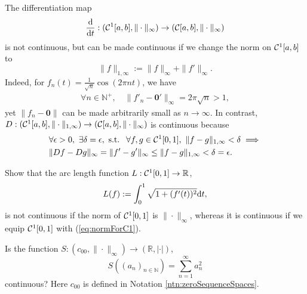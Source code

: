 \begin{exm}
  \label{exm:continuityOfDifferentiation}
  The differentiation map
  \begin{displaymath}
    \frac{\mathrm{d}}{\mathrm{d} t}:
    ({\cal C}^1[a,b],\|\cdot\|_{\infty})
    \rightarrow ({\cal C}[a,b], \|\cdot\|_{\infty})
  \end{displaymath}
  is not continuous, but can be made
  continuous if we change the norm on ${\cal C}^1[a,b]$ to
  \begin{equation}
    \label{eq:normForC1}
    \|f\|_{1,\infty}:= \|f\|_{\infty} + \|f'\|_{\infty}.
  \end{equation}
  Indeed,
  for $f_n(t) = \frac{1}{\sqrt{n}}\cos(2\pi nt)$,
  we have
  \begin{align*}
    \forall n\in \mathbb{N}^+,\quad
    \|f'_n-\mathbf{0}'\|_{\infty} = 2\pi\sqrt{n} > 1, 
  \end{align*}
  yet $\|f_n-\mathbf{0}\|$ can be made arbitrarily small
  as $n \rightarrow \infty$.
  In contrast,
  $D: ({\cal C}^1[a,b],\|\cdot\|_{1,\infty})
  \rightarrow ({\cal C}[a,b], \|\cdot\|_{\infty})$ is continuous because
  \begin{align*}
    &\forall \epsilon>0,\ \exists \delta=\epsilon, \text{ s.t. }\ 
      \forall f,g\in {\cal C}^1[0,1],\ 
      \|f - g\|_{1,\infty}<\delta
     \implies 
    \\
    &
    \|Df - Dg\|_{\infty}
    = \|f' - g'\|_{\infty} \le
    \|f - g\|_{1,\infty} < \delta=\epsilon.
  \end{align*}
\end{exm}

\begin{exc}
  \label{exc:arcLengthFunctionNotContinuous}
  Show that the arc length function $L: {\cal C}^1[0,1]\rightarrow\mathbb{R}$,
  \begin{equation}
    \label{eq:arcLengthFunction}
    L(f) := \int_0^1 \sqrt{1+(f'(t))^2} \mathrm{d} t,
  \end{equation}
  is not continuous if the norm of ${\cal C}^1[0,1]$ is
  $\|\cdot\|_{\infty}$,
  whereas it is continuous if we equip ${\cal C}^1[0,1]$ with
  (\ref{eq:normForC1}).
\end{exc}

\begin{exc}
  Is the function
  $S: (c_{00}, \|\cdot\|_{\infty}) \rightarrow (\mathbb{R}, |\cdot|)$,
  \begin{equation}
    \label{eq:c00FuncNotCont}
    S\left((a_n)_{n\in \mathbb{N}}\right) = \sum_{n=1}^{\infty} a_n^2
  \end{equation}
  continuous?
  Here $c_{00}$ is defined in Notation \ref{ntn:zeroSequenceSpaces}. 
\end{exc}

